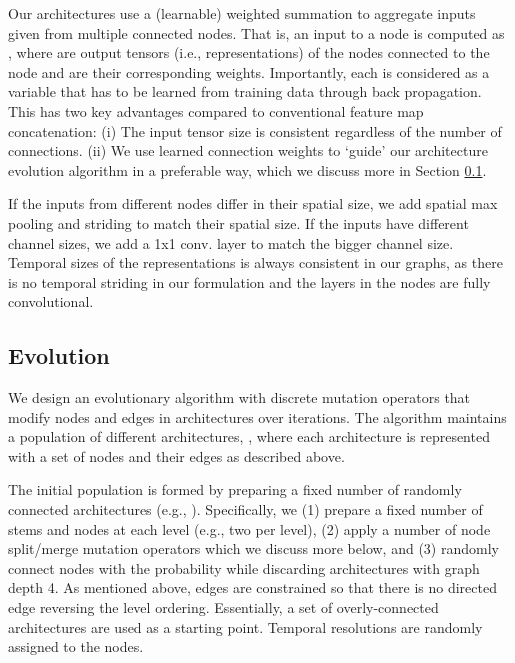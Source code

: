 \documentclass{article} \usepackage{iclr2020_conference,times}
\begin{document}
Our architectures use a (learnable) weighted summation to aggregate inputs given from multiple connected nodes.  That is, an input to a node is computed as , where  are output tensors (i.e., representations) of the nodes connected to the node and  are their corresponding weights. Importantly, each  is considered as a variable that has to be learned from training data through back propagation. This has two key advantages compared to conventional feature map concatenation: (i) The input tensor size is consistent regardless of the number of connections. (ii) We use learned connection weights to `guide' our architecture evolution algorithm in a preferable way, which we discuss more in Section \ref{subsec:evolution}.



If the inputs from different nodes differ in their spatial size, we add spatial max pooling and striding to match their spatial size. If the inputs have different channel sizes, we add a 1x1 conv. layer to match the bigger channel size. Temporal sizes of the representations is always consistent in our graphs, as there is no temporal striding in our formulation and the layers in the nodes are fully convolutional.












\subsection{Evolution}
\label{subsec:evolution}




We design an evolutionary algorithm with discrete mutation operators that modify nodes and edges in architectures over iterations. The algorithm maintains a population of  different architectures, , where each architecture  is represented with a set of nodes and their edges as described above.

The initial population is formed by preparing a fixed number of randomly connected architectures (e.g., ). Specifically, we (1) prepare a fixed number of stems and nodes at each level (e.g., two per level), (2) apply a number of node split/merge mutation operators which we discuss more below, and (3) randomly connect nodes with the probability  while discarding architectures with graph depth  4. As mentioned above, edges are constrained so that there is no directed edge reversing the level ordering. Essentially, a set of overly-connected architectures are used as a starting point. Temporal resolutions are randomly assigned to the nodes.
\end{document}
